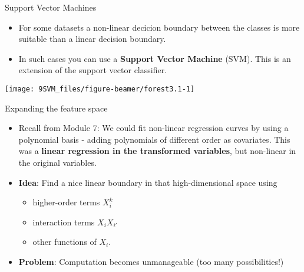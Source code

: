 \documentclass[10pt,ignorenonframetext,]{beamer}
\providecommand{\tightlist}{%
  \setlength{\itemsep}{0pt}\setlength{\parskip}{0pt}}
\begin{document}
\begin{frame}{Support Vector Machines}
\protect\hypertarget{support-vector-machines}{}

\begin{itemize}
\item
  For some datasets a non-linear decicion boundary between the classes
  is more suitable than a linear decision boundary.
\item
  In such cases you can use a \textbf{Support Vector Machine} (SVM).
  This is an extension of the support vector classifier.
\end{itemize}

\begin{center}\texttt{[image: 9SVM\_files/figure-beamer/forest3.1-1]} \end{center}

\end{frame}

\begin{frame}

\begin{block}{Expanding the feature space}

\vspace{2mm}

\begin{itemize}
\tightlist
\item
  Recall from Module 7: We could fit non-linear regression curves by
  using a polynomial basis - adding polynomials of different order as
  covariates. This was a \textbf{linear regression in the transformed
  variables}, but non-linear in the original variables.
\end{itemize}

\vspace{2mm}

\begin{itemize}
\tightlist
\item
  \textbf{Idea}: Find a nice linear boundary in that high-dimensional
  space using

  \begin{itemize}
  \tightlist
  \item
    higher-order terms \(X_i^k\)
  \item
    interaction terms \(X_i X_{i'}\)
  \item
    other functions of \(X_i\).
  \end{itemize}
\end{itemize}

\vspace{2mm}

\begin{itemize}
\tightlist
\item
  \textbf{Problem}: Computation becomes unmanageable (too many
  possibilities!)
\end{itemize}

\end{block}

\end{frame}
\end{document}

